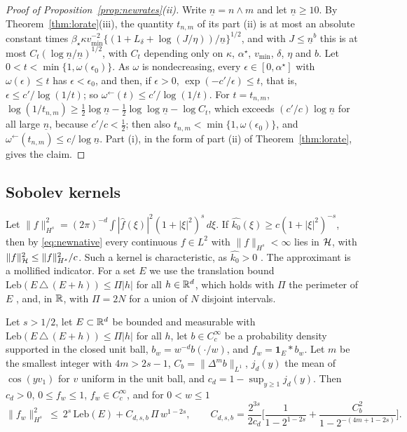 \begin{proof}[Proof of Proposition~\ref{prop:newrates}(ii)]
Write $\underline n=n\wedge m$ and let $\underline n\ge10$. By Theorem~\ref{thm:lorate}(iii), the quantity $t_{n,m}$
of its part (ii) is at most an absolute constant times
$\beta_\star\kappa v_{\min}^{-2}\{(1+L_\delta+\log(J/\eta))/\underline n\}^{1/2}$, and with $J\le\underline n^b$
this is at most $C_t(\log\underline n/\underline n)^{1/2}$, with $C_t$ depending only on $\kappa$, $\alpha^\star$,
$v_{\min}$, $\delta$, $\eta$ and $b$. Let $0<t<\min\{1,\omega(\epsilon_0)\}$. As $\omega$ is nondecreasing, every
$\epsilon\in[0,\alpha^\star]$ with $\omega(\epsilon)\le t$ has $\epsilon<\epsilon_0$, and then, if $\epsilon>0$,
$\exp(-c'/\epsilon)\le t$, that is, $\epsilon\le c'/\log(1/t)$; so $\omega^{\leftarrow}(t)\le c'/\log(1/t)$. For
$t=t_{n,m}$, $\log(1/t_{n,m})\ge\frac12\log\underline n-\frac12\log\log\underline n-\log C_t$, which exceeds
$(c'/c)\log\underline n$ for all large $\underline n$, because $c'/c<\frac12$; then also $t_{n,m}<\min\{1,\omega(\epsilon_0)\}$,
and $\omega^{\leftarrow}(t_{n,m})\le c/\log\underline n$. Part (i), in the form of part (ii) of
Theorem~\ref{thm:lorate}, gives the claim.
\end{proof}

\subsection{Sobolev kernels}

Let $\|f\|_{H^s}^2=(2\pi)^{-d}\int|\widehat f(\xi)|^2(1+|\xi|^2)^s\,d\xi$. If
$\widehat{k_0}(\xi)\ge c(1+|\xi|^2)^{-s}$, then by \eqref{eq:newnative} every continuous $f\in L^2$ with
$\|f\|_{H^s}<\infty$ lies in $\mathcal{H}$, with $\|f\|_{\mathcal{H}}^2\le\|f\|_{H^s}^2/c$. Such a kernel is characteristic, as
$\widehat{k_0}>0$ \citep{sriperumbudur2010hilbert}. The approximant is a mollified indicator. For a set $E$ we use the
translation bound $\mathrm{Leb}(E\,\triangle\,(E+h))\le\Pi|h|$ for all $h\in\mathbb{R}^d$, which holds with $\Pi$ the perimeter of $E$
\citep[Chapter~5]{evans2015measure}, and, in $\mathbb{R}$, with $\Pi=2N$ for a union of $N$ disjoint intervals.

\begin{lemma}
\label{lem:newsobnorm}
Let $s>1/2$, let $E\subset\mathbb{R}^d$ be bounded and measurable with $\mathrm{Leb}(E\,\triangle\,(E+h))\le\Pi|h|$ for all $h$, let
$b\in C_c^\infty$ be a probability density supported in the closed unit ball, $b_w=w^{-d}b(\cdot/w)$, and
$f_w=\mathbf 1_E*b_w$. Let $m$ be the smallest integer with $4m>2s-1$, $C_b=\|\Delta^mb\|_{L^1}$,
$j_d(y)$ the mean of $\cos(yv_1)$ for $v$ uniform in the unit ball, and $c_d=1-\sup_{y\ge1}j_d(y)$. Then $c_d>0$,
$0\le f_w\le1$, $f_w\in C_c^\infty$, and for $0<w\le1$
\[
\|f_w\|_{H^s}^2\ \le\ 2^s\,\mathrm{Leb}(E)+C_{d,s,b}\,\Pi\,w^{1-2s},
\qquad
C_{d,s,b}=\frac{2^{3s}}{2c_d}\Big[\frac1{1-2^{1-2s}}+\frac{C_b^2}{1-2^{-(4m+1-2s)}}\Big].
\]
\end{lemma}


